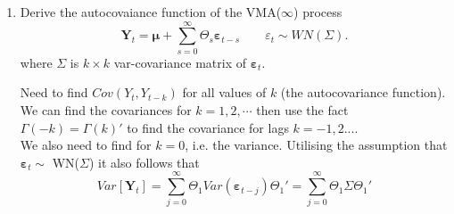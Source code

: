 \documentclass[oneside,openany]{tufte-book} %
\begin{document}
\begin{enumerate}
\begin{enumerate}
							
							
							
							
							
							
							
							\item If the true $\theta_1$ is bigger than 1 (in absolute value) then conditioning on $\varepsilon_0$ is not innocuous (for large sample sizes).
													\medskip
							Note that we derived $\varepsilon_t$ as a function of the observable data, noting that $\varepsilon_t=y_t-\mu-\theta_1\varepsilon_{t-1}$ and starting at $\varepsilon_0=0$. This is an AR(1) process in $\varepsilon_t$, and we know $\theta_1$ here must be less than 1 in absolute value or the impact of past shocks doesn't vanish for large sample sizes.\\
													\medskip
							We can recurse the shocks back t periods and find:\\
							 $\varepsilon_t=(y_t-\mu)-\theta(y_{t-1}-\mu) +\theta^2(y_{t-2}-\mu) - \cdots +(-1)^t\theta_1^t\varepsilon_0$
							
													\medskip
							If $|\theta_1|<1$ then $(-1)^t\theta_1^t\varepsilon_0$ is small for t large, and conditioning on $\varepsilon_0=0$ when it may not be true will have no asymptotic (large sample) impact on the approximation of the likelihood function. This is not the case when $|\theta_1|>1$. In this case we can exploit invertibility of MA models and re-write the model equivalent with a parameter $1/\theta_1$ and variance of the shocks $\theta_1^2\sigma^2$
					
					
						\end{enumerate}
						
									\vspace{10pt}
					
					
					
					
					\item Derive the autocovaiance function of the VMA($\infty$) process	\[
					\bm{Y}_{t}=\bm{\mu}+\sum_{s=0}^{\infty }\Theta_{s}\bm{\varepsilon }
					_{t-s} \qquad \varepsilon_t \sim WN(\Sigma).
					\]
					where $\Sigma$ is $k\times k$ var-covariance matrix of $\bm{\varepsilon}_t$.
														\vspace{10pt}
														
				Need to find $Cov(Y_{t}, Y_{t-k})$ for all values of $k$ (the autocovariance function).\\
			We can find the covariances for $k=1,2,\cdots$ then use the fact $\Gamma(-k)=\Gamma(k)'$ to find the covariance for lags $k=-1,2...$.\\
			\medskip
				We also need to find for $k=0$, i.e. the variance. Utilising the assumption that $\bm{\varepsilon}_t\sim$ WN($\Sigma$)  it also follows that
					\[ Var\left[ \textbf{Y}_{t}\right] =\sum_{j=0}^{\infty} \Theta_1Var(\bm{\varepsilon}_{t-j})\Theta_1'=\sum_{j=0}^{\infty} \Theta_1\Sigma\Theta_1'
					\]
		

\end{enumerate}
\end{document}
